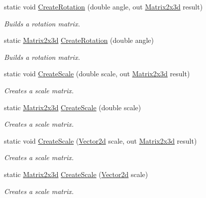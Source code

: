 \begin{DoxyCompactItemize}
\item 
static void \hyperlink{struct_open_t_k_1_1_matrix2x3d_a0854e1cadee1587d1b147ba2a64cec05}{Create\-Rotation} (double angle, out \hyperlink{struct_open_t_k_1_1_matrix2x3d}{Matrix2x3d} result)
\begin{DoxyCompactList}\small\item\em Builds a rotation matrix. \end{DoxyCompactList}\item 
static \hyperlink{struct_open_t_k_1_1_matrix2x3d}{Matrix2x3d} \hyperlink{struct_open_t_k_1_1_matrix2x3d_ae7079097794026ce586b721033429673}{Create\-Rotation} (double angle)
\begin{DoxyCompactList}\small\item\em Builds a rotation matrix. \end{DoxyCompactList}\item 
static void \hyperlink{struct_open_t_k_1_1_matrix2x3d_a2be4911bcf7124993c27acf85bb5c604}{Create\-Scale} (double scale, out \hyperlink{struct_open_t_k_1_1_matrix2x3d}{Matrix2x3d} result)
\begin{DoxyCompactList}\small\item\em Creates a scale matrix. \end{DoxyCompactList}\item 
static \hyperlink{struct_open_t_k_1_1_matrix2x3d}{Matrix2x3d} \hyperlink{struct_open_t_k_1_1_matrix2x3d_ac0e6c8cf00e7c4df4ec49ef59ab0aa72}{Create\-Scale} (double scale)
\begin{DoxyCompactList}\small\item\em Creates a scale matrix. \end{DoxyCompactList}\item 
static void \hyperlink{struct_open_t_k_1_1_matrix2x3d_a151cd6bcf64856f6ae4a004151a49410}{Create\-Scale} (\hyperlink{struct_open_t_k_1_1_vector2d}{Vector2d} scale, out \hyperlink{struct_open_t_k_1_1_matrix2x3d}{Matrix2x3d} result)
\begin{DoxyCompactList}\small\item\em Creates a scale matrix. \end{DoxyCompactList}\item 
static \hyperlink{struct_open_t_k_1_1_matrix2x3d}{Matrix2x3d} \hyperlink{struct_open_t_k_1_1_matrix2x3d_ac988adf60bcc2e2c41e48a03578b2128}{Create\-Scale} (\hyperlink{struct_open_t_k_1_1_vector2d}{Vector2d} scale)
\begin{DoxyCompactList}\small\item\em Creates a scale matrix. \end{DoxyCompactList}\item 

\end{DoxyCompactItemize}
